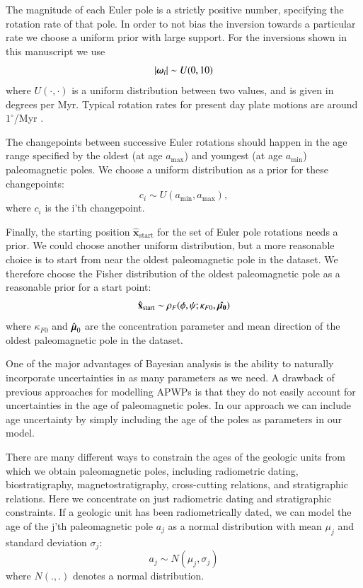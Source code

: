 \documentclass[preprint,12pt,authoryear]{elsarticle}
\newcommand{\mitbf}[1]{\hbox{\mathversion{bold}$#1$}}
\begin{document}
The magnitude of each Euler pole is a strictly positive number, specifying the
rotation rate of that pole. In order to not bias the inversion towards a particular
rate we choose a uniform prior with large support. For the inversions shown in
this manuscript we use
\begin{equation}
\vert \mitbf{\omega}_i \vert \sim U(0, 10)
\end{equation}
where $U(\cdot, \cdot)$ is a uniform distribution between two values, and is given
in degrees per Myr. Typical rotation rates for present day plate motions
are around $1^\circ$/Myr \citep{argus2011geologically}.

The changepoints between successive Euler rotations should happen in the age
range specified by the oldest (at age $a_\mathrm{max}$) and youngest (at age $a_\mathrm{min}$)
paleomagnetic poles. We choose a uniform distribution as a prior for these changepoints:
\begin{equation}
c_i \sim U( a_\mathrm{min}, a_\mathrm{max}),
\end{equation}
where $c_i$ is the i'th changepoint.

Finally, the starting position $\hat{\mathbf{x}}_\mathrm{start}$ for the set of Euler pole rotations needs a prior.
We could choose another uniform distribution, but a more reasonable choice
is to start from near the oldest paleomagnetic pole in the dataset.
We therefore choose the Fisher distribution of the oldest paleomagnetic pole as a reasonable prior for a start point:
\begin{equation}
\hat{\mathbf{x}}_\mathrm{start} \sim \rho_F(\phi, \psi; \kappa_{F0}, \hat{\mitbf{\mu_0}})
\end{equation}
where $\kappa_{F0}$ and $\hat{\mitbf{\mu}}_0$ are the concentration parameter and mean direction
of the oldest paleomagnetic pole in the dataset.

One of the major advantages of Bayesian analysis is the ability to naturally incorporate
uncertainties in as many parameters as we need. A drawback of previous approaches
for modelling APWPs is that they do not easily account for uncertainties in
the age of paleomagnetic poles. In our approach we can include age uncertainty
by simply including the age of the poles as parameters in our model.

There are many different ways to constrain the ages of the geologic units from
which we obtain paleomagnetic poles, including radiometric dating, biostratigraphy,
magnetostratigraphy, cross-cutting relations, and stratigraphic relations.
Here we concentrate on just radiometric dating and stratigraphic constraints.
If a geologic unit has been radiometrically dated, we can model the age of
the j'th paleomagnetic pole $a_j$ as a normal distribution with mean $\mu_j$ and standard deviation $\sigma_j$:
\begin{equation}
a_j \sim N(\mu_j, \sigma_j)
\end{equation}
where $N(.,.)$ denotes a normal distribution.
\end{document}
